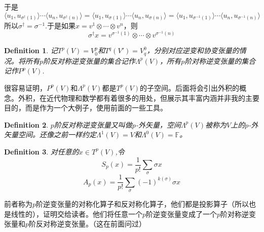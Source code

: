 \documentclass[11pt,a4paper,openany]{book}%
\theoremstyle{plain}%
\newtheorem{defi}{Definition}[chapter]%
\begin{document}
于是
\[
\langle u_{1},u_{\sigma^\dag(1)} \rangle \cdots \langle u_{n},u_{\sigma^\dag(n)} \rangle=\langle u_1,u_{\sigma(1)} \rangle \cdots \langle u_n,u_{\sigma(n)} \rangle=\langle u_{1},u_{\sigma^{-1}(1)} \rangle \cdots \langle u_{n},u_{\sigma^{-1}(n)} \rangle
\]
所以$\sigma^\dag=\sigma^{-1}$.于是如果$x=v^1\otimes \cdots \otimes v^n$，则
\[
\sigma^\dag x=v^{\sigma^{-1}(1)}\otimes \cdots \otimes v^{\sigma^{-1}(n)}
\]
\begin{defi}
记$T^p(V)=V^p_0$和$T^q(V')=V^0_q$，分别对应逆变和协变张量的情况。将所有$p$阶反对称逆变张量的集合记作$\Lambda^p(V)$，所有$p$阶对称逆变张量的集合记作$P^p(V)$.
\end{defi}
很容易证明，$P^p(V)$和$\Lambda^p(V)$都是$T^p(V)$的子空间。后面将会引出外积的概念。外积，在近代物理和数学都有着很多的用处，但展示其丰富内涵并非我的主要目的，而是作为一个大例子，使用前面的一些工具。
\begin{defi}
$p$阶反对称逆变张量又叫做$p$-外矢量，空间$\Lambda^p(V)$被称为$V$上的$p$-外矢量空间。还像之前一样约定$\Lambda^1(V)=V$和$\Lambda^0(V)=\mathbb{F}$。
\end{defi}
\begin{defi}
对任意的$x\in T^p(V)$,令
\[
S_p(x)=\frac{1}{p!}\sum_{\sigma}\sigma x
\]
\[
A_p(x)=\frac{1}{p!}\sum_{\sigma}(-1)^{k(\sigma)}\sigma x
\]
\end{defi}
前者称为$p$阶逆变张量的对称化算子和反对称化算子，他们都是投影算子（所以也是线性的），证明交给读者。他们将任意一个$p$阶逆变张量变成了一个$p$阶对称逆变张量和$p$阶反对称逆变张量。（这在前面问过）
\end{document}
